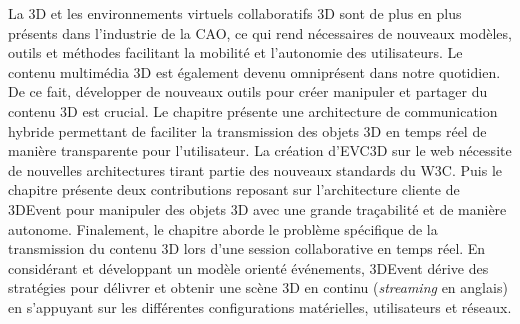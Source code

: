 La \gls{3D} et les environnements virtuels collaboratifs \gls{3D} sont 
de plus en plus présents dans l'industrie de la \gls{CAO}, ce qui rend nécessaires de nouveaux 
modèles, outils et méthodes facilitant la mobilité et l'autonomie des utilisateurs. Le contenu multimédia \gls{3D} est également devenu omniprésent dans notre quotidien. De ce fait, développer 
de nouveaux outils pour créer manipuler et partager du contenu \gls{3D} est crucial.
Le chapitre  présente une architecture de communication hybride 
permettant de faciliter la transmission des objets \gls{3D} en temps réel de 
manière transparente pour l'utilisateur. La création d'\gls{EVC3D} sur le web nécessite de nouvelles architectures tirant partie des nouveaux standards du 
\gls{W3C}. Puis le chapitre  présente deux  contributions reposant sur l'architecture cliente de 3DEvent pour 
manipuler des objets \gls{3D} avec une grande traçabilité et de manière autonome. 
Finalement, le chapitre aborde le problème spécifique de 
la transmission du contenu \gls{3D} lors d'une session collaborative en temps réel. 
En considérant et développant un modèle orienté événements, 3DEvent dérive 
des 
stratégies pour délivrer et obtenir une scène \gls{3D} en continu (\textit{streaming} 
en 
anglais) en s'appuyant sur les différentes configurations matérielles, utilisateurs et 
réseaux.